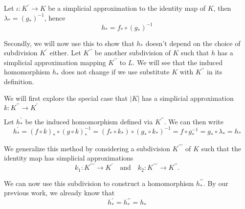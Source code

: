 \documentclass[toc=bib, headinclude]{scrartcl}
\theoremstyle{plain}
\theoremstyle{definition}
\theoremstyle{remark}
\newcommand{\pprime}{{\prime\prime}}
\newcommand{\ppprime}{{\pprime\prime}}
\newcommand{\qandq}{\quad \text{and} \quad}
\begin{document}
Let $\iota: K^\prime\to K $ be a simplicial approximation to the identity map of $K$, then $\lambda_\ast=(g_\ast)^{-1}$, hence
\[
h_\ast=f_\ast\circ(g_\ast)^{-1}
\]

Secondly, we will now use this to show that $h_\ast$ doesn't depend on the choice of subdivision $K^\prime$ either. Let $K^\pprime$ be another subdivision of $K$ such that $h$ has a simplicial approximation mapping $K^\pprime$ to $L$. We will see that the induced homomorphism $h_\ast$ does not change if we use substitute $K$ with $K^\pprime$ in its definition.

We will first explore the special case that $|K|$ has a simplicial approximation $k: K^\pprime\to K^\prime$

\begin{center}
	
\end{center}

Let $h_\ast^\prime$ be the induced homomorphism defined via $K^\pprime$. We can then write
\[
h_\ast^\prime=(f\circ k)_\ast\circ(g\circ k)_\ast^{-1}=(f_\ast\circ k_\ast)\circ(g_\ast\circ k_\ast)^{-1}=f\circ g_\ast^{-1}=g_\ast\circ\lambda_\ast=h_\ast
\]

We generalize this method by considering a subdivision $K^\ppprime$ of $K$ such that the identity map has simplicial approximations
\[
k_1: K^\ppprime\to K^\prime\qandq k_2: K^\ppprime\to K^\pprime.
\]

We can now use this subdivision to construct a homomorphism $h_\ast^\pprime$. By our previous work, we already know that 
\[
h_\ast^\prime=h_\ast^\pprime=h_\ast
\]
\end{document}
